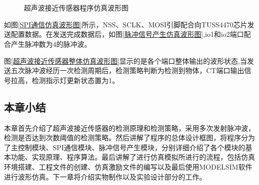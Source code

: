 \begin{figure}[ht]
	\centering
	\\
	\centering
	\\
	
	\caption{超声波接近传感器程序仿真波形图}
	\label{超声波接近传感器程序仿真波形图}
\end{figure}


如图\ref{SPI通信仿真波形图}所示，NSS、SCLK、MOSI引脚配合向TUSS4470芯片发送配置数据。在发送完成数据后，如图\ref{脉冲信号产生仿真波形图},io1和io2端口配合产生脉冲数为4的脉冲波。\par
图\ref{超声波接近传感器整体仿真波形图}显示的是各个端口整体输出的波形状态,当发送五次脉冲波经历一次检测周期后，检测策略判断为检测到物体，CT端口输出信号拉高，检测指示灯更新状态置为1。\par
\subsection{本章小结}
本章首先介绍了超声波接近传感器的检测原理和检测策略，采用多次发射脉冲波，检测是否达到次数阈值的检测策略。然后讲解了程序的总体设计框图，将程序分为了主控制模块、SPI通信模块、脉冲信号产生模块，分别详细介绍了各个模块的基本功能、实现原理、程序算法。最后讲解了进行仿真模拟所进行的流程，包括仿真环境搭建、工程文件的创建、仿真激励文件的编写以及最后使用MODELSIM软件进行波形仿真。下一章将介绍实物制作以及实验设计部分的工作。
